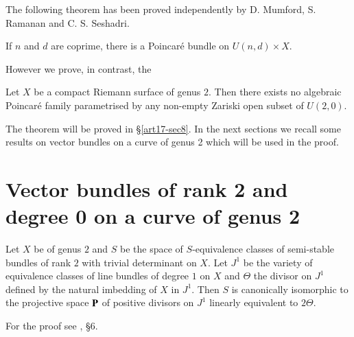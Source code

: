 The following theorem has been proved independently by D. Mumford, S. Ramanan and C. S. Seshadri.

\begin{theorem*}
If $n$ and $d$ are coprime, there is a Poincar\'e bundle on $U(n,d)\times X$.
\end{theorem*}

However we prove, in contrast, the 

\begin{maintheorem*}
Let $X$ be a compact Riemann surface of genus $2$. Then there exists no algebraic Poincar\'e family parametrised by any non-empty Zariski open subset of $U(2,0)$.
\end{maintheorem*}

The theorem will be proved in \S\ref{art17-sec8}. In the next sections we recall some results on vector bundles on a curve of genus 2 which will be used in the proof.

\section{Vector bundles of rank 2 and degree 0 on a curve of genus 2}\label{art17-sec4}

\begin{theorem}\label{art17-thm4.1}
Let $X$ be of genus $2$ and $S$ be the space of $S$-equivalence classes of semi-stable bundles of rank $2$ with trivial determinant on $X$. Let $J^{1}$ be the variety of equivalence classes of line bundles of degree $1$ on $X$ and $\Theta$ the divisor on $J^{1}$ defined by the natural imbedding of $X$ in $J^{1}$. Then $S$ is canonically isomorphic to the projective space $\mathbf{P}$ of positive divisors on $J^{1}$ linearly equivalent to $2\Theta$.
\end{theorem}

For the proof see \cite{art14-key3}, \S6.

